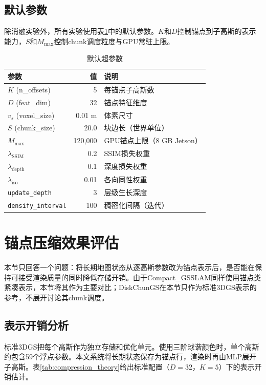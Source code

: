 \subsection{默认参数}

除消融实验外，所有实验使用表\ref{tab:default_hp}中的默认参数。$K$和$D$控制锚点到子高斯的表示能力，$S$和$M_{\max}$控制chunk调度粒度与GPU常驻上限。

\begin{table}[htbp]
\centering
\caption{默认超参数}
\label{tab:default_hp}
\begin{tabular}{lrl}
\toprule
\textbf{参数} & \textbf{值} & \textbf{说明} \\
\midrule
$K$ (n\_offsets) & 5 & 每锚点子高斯数 \\
$D$ (feat\_dim) & 32 & 锚点特征维度 \\
$v_s$ (voxel\_size) & 0.01 m & 体素尺寸 \\
$S$ (chunk\_size) & 20.0 & 块边长（世界单位） \\
$M_{\max}$ & 120,000 & GPU锚点上限（8 GB Jetson） \\
$\lambda_{\text{SSIM}}$ & 0.2 & SSIM损失权重 \\
$\lambda_{\text{depth}}$ & 0.1 & 深度损失权重 \\
$\lambda_{\text{iso}}$ & 0.01 & 各向同性权重 \\
\texttt{update\_depth} & 3 & 层级生长深度 \\
\texttt{densify\_interval} & 100 & 稠密化间隔（迭代） \\
\bottomrule
\end{tabular}
\end{table}

\section{锚点压缩效果评估}

本节只回答一个问题：将长期地图状态从逐高斯参数改为锚点表示后，是否能在保持可接受渲染质量的同时降低存储开销。由于Compact\_GSSLAM同样使用锚点类紧凑表示，本节将其作为主要对比；DiskChunGS在本节只作为标准3DGS表示的参考，不展开讨论其chunk调度。

\subsection{表示开销分析}

标准3DGS把每个高斯作为独立存储和优化单元。使用三阶球谐颜色时，单个高斯约包含59个浮点参数。本文系统将长期状态保存为锚点行，渲染时再由MLP展开子高斯。表\ref{tab:compression_theory}给出标准配置（$D=32$，$K=5$）下的表示开销估计。


